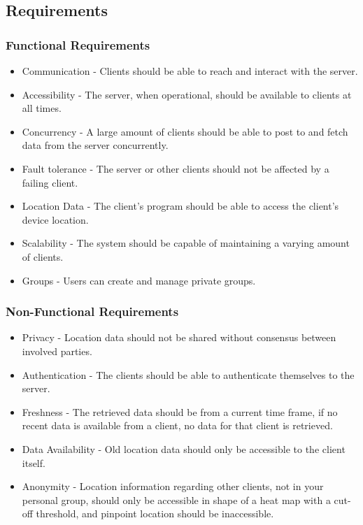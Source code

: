 \subsection{Requirements}

\subsubsection{Functional Requirements}
\begin{itemize}
    \item Communication - Clients should be able to reach and interact with the server.
    
    \item Accessibility - The server, when operational, should be available to clients at all times.
    
    \item Concurrency - A large amount of clients should be able to post to and fetch data from the server concurrently.
    
    \item Fault tolerance - The server or other clients should not be affected by a failing client.
    
    \item Location Data - The client's program should be able to access the client's device location.
    
    \item Scalability - The system should be capable of maintaining a varying amount of clients.
    
    \item Groups - Users can create and manage private groups.
\end{itemize}

\subsubsection{Non-Functional Requirements}

\begin{itemize}
    \item Privacy - Location data should not be shared without consensus between involved parties.
    
    \item Authentication - The clients should be able to authenticate themselves to the server.
    
    \item Freshness - The retrieved data should be from a current time frame, if no recent data is available from a client, no data for that client is retrieved.
    
    \item Data Availability - Old location data should only be accessible to the client itself.
    
    \item Anonymity - Location information regarding other clients, not in your personal group, should only be accessible in shape of a heat map with a cut-off threshold, and pinpoint location should be inaccessible.
\end{itemize}


